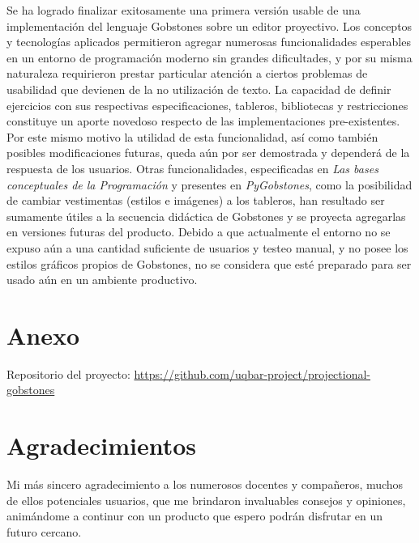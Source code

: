 Se ha logrado finalizar exitosamente una primera versión usable de una implementación del lenguaje Gobstones sobre un editor proyectivo. Los conceptos y tecnologías aplicados permitieron agregar numerosas funcionalidades esperables en un entorno de programación moderno sin grandes dificultades, y por su misma naturaleza requirieron prestar particular atención a ciertos problemas de usabilidad que devienen de la no utilización de texto.
La capacidad de definir ejercicios con sus respectivas especificaciones, tableros, bibliotecas y restricciones constituye un aporte novedoso respecto de las implementaciones pre-existentes. Por este mismo motivo la utilidad de esta funcionalidad, así como también posibles modificaciones futuras, queda aún por ser demostrada y dependerá de la respuesta de los usuarios. Otras funcionalidades, especificadas en \textit{Las bases conceptuales de la Programación} \cite{Gobstones} y presentes en \textit{PyGobstones}, como la posibilidad de cambiar vestimentas (estilos e imágenes) a los tableros, han resultado ser sumamente útiles a la secuencia didáctica de Gobstones y se proyecta agregarlas en versiones futuras del producto.
Debido a que actualmente el entorno no se expuso aún a una cantidad suficiente de usuarios y testeo manual, y no posee los estilos gráficos propios de Gobstones, no se considera que esté preparado para ser usado aún en un ambiente productivo. 

\section{Anexo}\label{anexo}

Repositorio del proyecto: \url{https://github.com/uqbar-project/projectional-gobstones}

\section{Agradecimientos}

Mi más sincero agradecimiento a los numerosos docentes y compañeros, muchos de ellos potenciales usuarios, que me brindaron invaluables consejos y opiniones, animándome a continur con un producto que espero podrán disfrutar en un futuro cercano.
